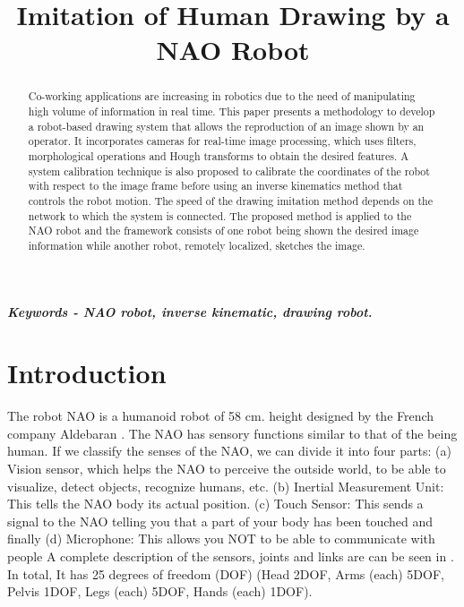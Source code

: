 \documentclass[conference]{IEEEtran}
\begin{document}
\title{	Imitation of Human Drawing by a NAO Robot}
\author{
}
\maketitle
\begin{abstract}
Co-working applications are increasing in robotics due to the need of manipulating high volume of information in real time. This paper presents a methodology to develop a robot-based drawing system that allows the reproduction of an image shown by an operator. It incorporates cameras for real-time image processing, which uses filters, morphological operations and Hough transforms to obtain the desired features. A system calibration technique is also proposed to calibrate the coordinates of the robot with respect to the image frame before using an inverse kinematics method that controls the robot motion. The speed of the drawing imitation method depends on the network to which the system is connected. The proposed method is applied to the NAO robot and the framework consists of one robot being shown the desired image information while another robot, remotely localized, sketches the image.
\end{abstract}
\IEEEpeerreviewmaketitle
\textbf{\textit{Keywords - NAO robot, inverse kinematic, drawing robot.}}

\section{Introduction}
The robot NAO is a humanoid robot of 58 cm. height designed by the French company Aldebaran \cite{ref1}. The NAO has sensory functions similar to that of the
being human. If we classify the senses of the NAO, we can divide it into four parts: (a) Vision sensor, which helps the NAO to perceive the outside world, to be able to visualize, detect objects, recognize humans, etc. (b) Inertial Measurement Unit: This tells the NAO body its actual position. (c) Touch Sensor: This sends a signal to the NAO telling you that a part of your body has been touched and finally (d) Microphone: This allows you NOT to be able to communicate with people A complete description of the sensors, joints and links are can be seen in \cite{ref2}. In total, It has 25 degrees of freedom (DOF) (Head 2DOF, Arms (each) 5DOF, Pelvis 1DOF, Legs (each) 5DOF, Hands (each) 1DOF).
\end{document}
